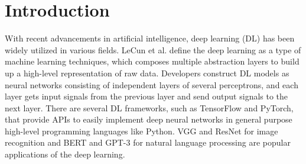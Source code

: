 \section{Introduction}\label{sec:intro}

With recent advancements in artificial intelligence, deep learning (DL) has
been widely utilized in various fields.
LeCun et al.\cite{LeCun2015} define the deep learning as a type of machine
learning techniques, which composes multiple abstraction layers to build up a
high-level representation of raw data. 
Developers construct DL models as neural networks consisting of independent
layers of several perceptrons, and each layer gets input signals from the
previous layer and send output signals to the next layer.
There are several DL frameworks, such as TensorFlow and PyTorch, that provide
APIs to easily implement deep neural networks in general purpose high-level
programming languages like Python.
VGG\cite{vggnet2014} and ResNet\cite{resnet2015} for image recognition and
BERT\cite{bert2018} and GPT-3\cite{gpt32020} for natural language processing
are popular applications of the deep learning.


